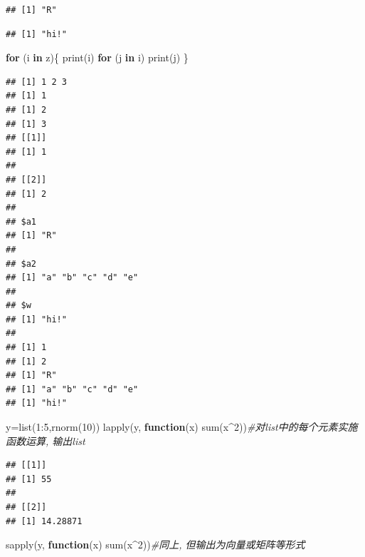 \documentclass[
]{book}
\newenvironment{Shaded}{\begin{snugshade}}{\end{snugshade}}
\newcommand{\CommentTok}[1]{\textcolor[rgb]{0.56,0.35,0.01}{\textit{#1}}}
\newcommand{\ControlFlowTok}[1]{\textcolor[rgb]{0.13,0.29,0.53}{\textbf{#1}}}
\newcommand{\DecValTok}[1]{\textcolor[rgb]{0.00,0.00,0.81}{#1}}
\newcommand{\FunctionTok}[1]{\textcolor[rgb]{0.00,0.00,0.00}{#1}}
\newcommand{\NormalTok}[1]{#1}
\newcommand{\OtherTok}[1]{\textcolor[rgb]{0.56,0.35,0.01}{#1}}
\newcommand{\SpecialCharTok}[1]{\textcolor[rgb]{0.00,0.00,0.00}{#1}}
\begin{document}
\begin{verbatim}
## [1] "R"
\end{verbatim}

\begin{Shaded}
\end{Shaded}

\begin{verbatim}
## [1] "hi!"
\end{verbatim}

\begin{Shaded}
\begin{Highlighting}[]
\ControlFlowTok{for}\NormalTok{ (i }\ControlFlowTok{in}\NormalTok{ z)\{}
  \FunctionTok{print}\NormalTok{(i)}
  \ControlFlowTok{for}\NormalTok{ (j }\ControlFlowTok{in}\NormalTok{ i)}
    \FunctionTok{print}\NormalTok{(j)}
\NormalTok{\}}
\end{Highlighting}
\end{Shaded}

\begin{verbatim}
## [1] 1 2 3
## [1] 1
## [1] 2
## [1] 3
## [[1]]
## [1] 1
## 
## [[2]]
## [1] 2
## 
## $a1
## [1] "R"
## 
## $a2
## [1] "a" "b" "c" "d" "e"
## 
## $w
## [1] "hi!"
## 
## [1] 1
## [1] 2
## [1] "R"
## [1] "a" "b" "c" "d" "e"
## [1] "hi!"
\end{verbatim}

\begin{Shaded}
\begin{Highlighting}[]
\NormalTok{y}\OtherTok{=}\FunctionTok{list}\NormalTok{(}\DecValTok{1}\SpecialCharTok{:}\DecValTok{5}\NormalTok{,}\FunctionTok{rnorm}\NormalTok{(}\DecValTok{10}\NormalTok{))}
\FunctionTok{lapply}\NormalTok{(y, }\ControlFlowTok{function}\NormalTok{(x) }\FunctionTok{sum}\NormalTok{(x}\SpecialCharTok{\^{}}\DecValTok{2}\NormalTok{))}\CommentTok{\#对list中的每个元素实施函数运算, 输出list}
\end{Highlighting}
\end{Shaded}

\begin{verbatim}
## [[1]]
## [1] 55
## 
## [[2]]
## [1] 14.28871
\end{verbatim}

\begin{Shaded}
\begin{Highlighting}[]
\FunctionTok{sapply}\NormalTok{(y, }\ControlFlowTok{function}\NormalTok{(x) }\FunctionTok{sum}\NormalTok{(x}\SpecialCharTok{\^{}}\DecValTok{2}\NormalTok{))}\CommentTok{\#同上, 但输出为向量或矩阵等形式}
\end{Highlighting}
\end{Shaded}
\end{document}
